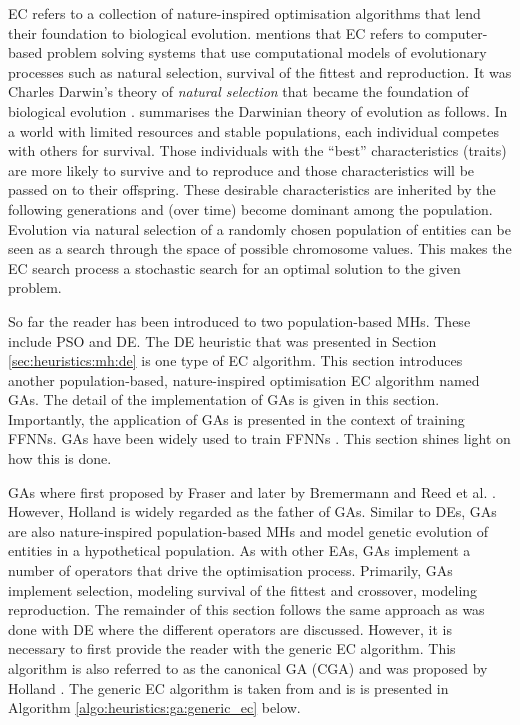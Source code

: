 \Ac{EC} refers to a collection of nature-inspired optimisation algorithms that lend their foundation to biological evolution. \citeauthor{ref:engelbrecht:2007}\cite{ref:engelbrecht:2007} mentions that \ac{EC} refers to computer-based problem solving systems that use computational models of evolutionary processes such as natural selection, survival of the fittest and reproduction. It was Charles Darwin's theory of \textit{natural selection} that became the foundation of biological evolution \cite{ref:darwin:1987}. \citeauthor{ref:engelbrecht:2007}\cite{ref:engelbrecht:2007} summarises the Darwinian theory of evolution \cite{ref:darwin:2012} as follows. In a world with limited resources and stable populations, each individual competes with others for survival. Those individuals with the ``best'' characteristics (traits) are more likely to survive and to reproduce and those characteristics will be passed on to their offspring. These desirable characteristics are inherited by the following generations and (over time) become dominant among the population. Evolution via natural selection of a randomly chosen population of entities can be seen as a search through the space of possible chromosome values. This makes the \ac{EC} search process a stochastic search for an optimal solution to the given problem.

So far the reader has been introduced to two population-based \acp{MH}. These include \ac{PSO} and \ac{DE}. The \ac{DE} heuristic that was presented in Section \ref{sec:heuristics:mh:de} is one type of \ac{EC} algorithm. This section introduces another population-based, nature-inspired optimisation \ac{EC} algorithm named \aclp{GA}. The detail of the implementation of \acp{GA} is given in this section. Importantly, the application of \acp{GA} is presented in the context of training \acp{FFNN}. \acp{GA} have been widely used to train \acp{FFNN} \cite{ref:montana:1989}\cite{ref:siddique:2001}\cite{ref:miller:1989}. This section shines light on how this is done.

\Acp{GA} where first proposed by Fraser \cite{ref:fraser:1957} and later by Bremermann \cite{ref:bremermann:1962} and Reed et al. \cite{ref:reed:1967}. However, Holland \cite{ref:holland:1992} is widely regarded as the father of \acp{GA}. Similar to \acp{DE}, \acp{GA} are also nature-inspired population-based \acp{MH} and model genetic evolution of entities in a hypothetical population. As with other \acp{EA}, \acp{GA} implement a number of operators that drive the optimisation process.  Primarily, \acp{GA} implement selection, modeling survival of the fittest and crossover, modeling reproduction. The remainder of this section follows the same approach as was done with \ac{DE} where the different operators are discussed. However, it is necessary to first provide the reader with the generic \ac{EC} algorithm. This algorithm is also referred to as the canonical \ac{GA} (CGA) and was proposed by Holland \cite{ref:holland:1992}. The generic \ac{EC} algorithm is taken from \cite{ref:engelbrecht:2007} and is is presented in Algorithm \ref{algo:heuristics:ga:generic_ec} below.

